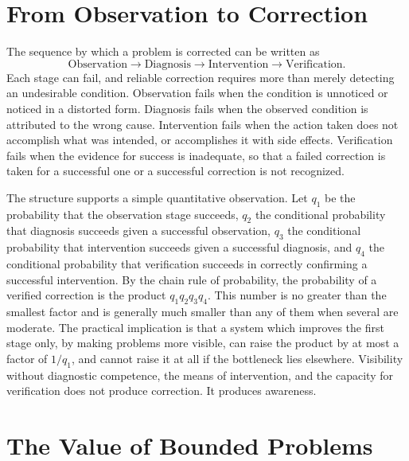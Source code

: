 \documentclass[11pt]{report}
\theoremstyle{definition}
\theoremstyle{remark}
\begin{document}
\section{From Observation to Correction}

The sequence by which a problem is corrected can be written as
\[
\text{Observation}\rightarrow\text{Diagnosis}\rightarrow\text{Intervention}\rightarrow\text{Verification}.
\]
Each stage can fail, and reliable correction requires more than merely detecting an undesirable condition. Observation fails when the condition is unnoticed or noticed in a distorted form. Diagnosis fails when the observed condition is attributed to the wrong cause. Intervention fails when the action taken does not accomplish what was intended, or accomplishes it with side effects. Verification fails when the evidence for success is inadequate, so that a failed correction is taken for a successful one or a successful correction is not recognized.

The structure supports a simple quantitative observation. Let $q_1$ be the probability that the observation stage succeeds, $q_2$ the conditional probability that diagnosis succeeds given a successful observation, $q_3$ the conditional probability that intervention succeeds given a successful diagnosis, and $q_4$ the conditional probability that verification succeeds in correctly confirming a successful intervention. By the chain rule of probability, the probability of a verified correction is the product $q_1q_2q_3q_4$. This number is no greater than the smallest factor and is generally much smaller than any of them when several are moderate. The practical implication is that a system which improves the first stage only, by making problems more visible, can raise the product by at most a factor of $1/q_1$, and cannot raise it at all if the bottleneck lies elsewhere. Visibility without diagnostic competence, the means of intervention, and the capacity for verification does not produce correction. It produces awareness.

\section{The Value of Bounded Problems}
\end{document}

